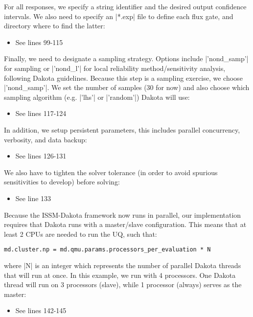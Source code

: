 For all responses, we specify a string identifier and the desired output confidence intervals. We also need to specify an \lstinlinebg|*.exp| file to define each flux gate, and directory where to find the latter:
\begin{itemize}
	\item See lines 99-115
\end{itemize}

Finally, we need to designate a sampling strategy. Options include \lstinlinebg|'nond_samp'| for sampling or \lstinlinebg|'nond_l'| for local reliability method/sensitivity analysis, following Dakota guidelines. Because this step is a sampling exercise, we choose \lstinlinebg|'nond_samp'|. We set the number of samples (30 for now) and also choose which sampling algorithm (e.g. \lstinlinebg|'lhs'| or \lstinlinebg|'random'|) Dakota will use:
\begin{itemize}
	\item See lines 117-124
\end{itemize}

In addition, we setup persistent parameters, this includes parallel concurrency, verbosity, and data backup:
\begin{itemize}
	\item See lines 126-131
\end{itemize}

We also have to tighten the solver tolerance (in order to avoid spurious sensitivities to develop) before solving:
\begin{itemize}
	\item See line 133
\end{itemize}

Because the ISSM-Dakota framework now runs in parallel, our implementation requires that Dakota runs with a master/slave configuration. This means that at least 2 CPUs are needed to run the UQ, such that:
\begin{lstlisting}
md.cluster.np = md.qmu.params.processors_per_evaluation * N
\end{lstlisting}

where \lstinlinebg|N| is an integer which represents the number of parallel Dakota threads that will run at once. In this example, we run with 4 processors. One Dakota thread will run on 3 processors (slave), while 1 processor (always) serves as the master:
\begin{itemize}
	\item See lines 142-145
\end{itemize}

